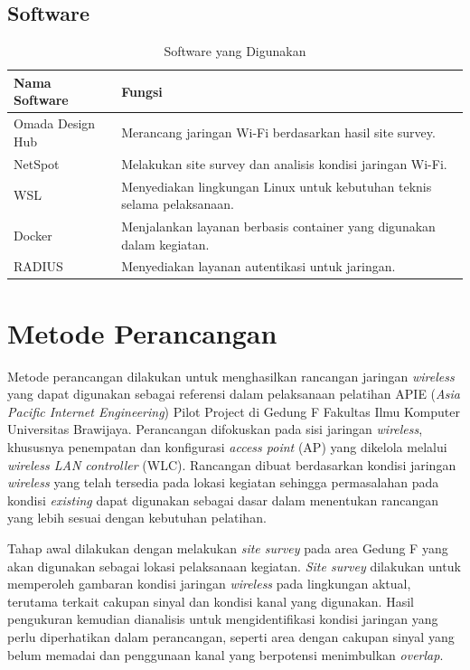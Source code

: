 \subsection{Software}

\begin{table}[H]
\centering
\caption{Software yang Digunakan}
\label{tab:software}
\begin{tabular}{|p{4cm}|p{10cm}|}
\hline
\textbf{Nama Software} & \textbf{Fungsi} \\ \hline
Omada Design Hub & Merancang jaringan Wi-Fi berdasarkan hasil site survey. \\ \hline
NetSpot & Melakukan site survey dan analisis kondisi jaringan Wi-Fi. \\ \hline
WSL & Menyediakan lingkungan Linux untuk kebutuhan teknis selama pelaksanaan. \\ \hline
Docker & Menjalankan layanan berbasis container yang digunakan dalam kegiatan. \\ \hline
RADIUS & Menyediakan layanan autentikasi untuk jaringan. \\ \hline
\end{tabular}
\end{table}


\section{Metode Perancangan}

Metode perancangan dilakukan untuk menghasilkan rancangan jaringan \textit{wireless} 
yang dapat digunakan sebagai referensi dalam pelaksanaan pelatihan APIE 
(\textit{Asia Pacific Internet Engineering}) Pilot Project di Gedung F Fakultas Ilmu 
Komputer Universitas Brawijaya. Perancangan difokuskan pada sisi jaringan \textit{wireless}, 
khususnya penempatan dan konfigurasi \textit{access point} (AP) yang dikelola melalui 
\textit{wireless LAN controller} (WLC). Rancangan dibuat berdasarkan kondisi jaringan 
\textit{wireless} yang telah tersedia pada lokasi kegiatan sehingga permasalahan pada 
kondisi \textit{existing} dapat digunakan sebagai dasar dalam menentukan rancangan yang 
lebih sesuai dengan kebutuhan pelatihan.

Tahap awal dilakukan dengan melakukan \textit{site survey} pada area Gedung F yang 
akan digunakan sebagai lokasi pelaksanaan kegiatan. \textit{Site survey} dilakukan 
untuk memperoleh gambaran kondisi jaringan \textit{wireless} pada lingkungan aktual, 
terutama terkait cakupan sinyal dan kondisi kanal yang digunakan. Hasil pengukuran 
kemudian dianalisis untuk mengidentifikasi kondisi jaringan yang perlu diperhatikan 
dalam perancangan, seperti area dengan cakupan sinyal yang belum memadai dan penggunaan 
kanal yang berpotensi menimbulkan \textit{overlap}.

